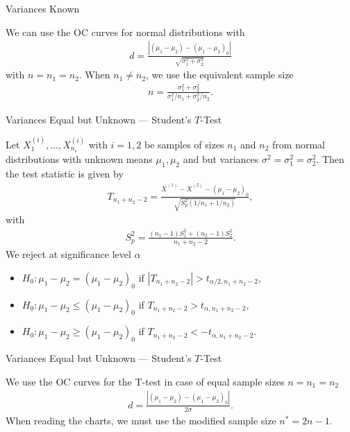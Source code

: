 \begin{frame}{Variances Known}

\justifying
{} We can use the OC curves for normal distributions with
\begin{align*}
d = \frac{|(\mu_1-\mu_2)-(\mu_1-\mu_2)_0|}{\sqrt{\sigma_1^2+\sigma_2^2}}
\end{align*}
with $n = n_1 = n_2$. When $n_1\neq n_2$, we use the equivalent sample size
\begin{align*}
n = \frac{\sigma_1^2 + \sigma_2^2}{\sigma_1^2/n_1 + \sigma_2^2/n_2}.
\end{align*}

\end{frame}

\begin{frame}{Variances Equal but Unknown --- Student's $T$-Test}

\justifying
{} Let $X_1^{(i)}, \ldots, X_{n_i}^{(i)}$ with $i = 1, 2$ be samples of sizes $n_1$ and $n_2$ from normal distributions with unknown means $\mu_1, \mu_2$ and  but  variances $\sigma^2 = \sigma_1^2 = \sigma_2^2$. Then the test statistic is given by
\footnotesize
\begin{align*}
T_{n_1+n_2-2} = \frac{\overline{X}^{(1)} - \overline{X}^{(2)} - (\mu_1-\mu_2)_0}{\sqrt{S_p^2(1/n_1+1/n_2)}},
\end{align*}
\normalsize
with 
\footnotesize
\begin{align*}
S_p^2 = \frac{(n_1-1)S_1^2 + (n_2-1)S_2^2}{n_1+n_2-2}.
\end{align*}
\normalsize
We reject at significance level $\alpha$
\begin{itemize}
	\item $H_0: \mu_1 - \mu_2 = (\mu_1-\mu_2)_0$ if $|T_{n_1+n_2-2}| > t_{\alpha/2, n_1+n_2-2}$,
	\item $H_0: \mu_1 - \mu_2 \leq (\mu_1-\mu_2)_0$ if $T_{n_1+n_2-2} > t_{\alpha,n_1+n_2-2}$,
	\item $H_0: \mu_1 - \mu_2 \geq (\mu_1-\mu_2)_0$ if $T_{n_1+n_2-2} < -t_{\alpha,n_1+n_2-2}$.
\end{itemize}

\end{frame}


\begin{frame}{Variances Equal but Unknown --- Student's $T$-Test}

\justifying
{} We use the OC curves for the T-test in case of equal sample sizes $n = n_1 = n_2$
\begin{align*}
d = \frac{|(\mu_1-\mu_2)-(\mu_1-\mu_2)_0|}{2\sigma}.
\end{align*}
When reading the charts, we must use the modified sample size $n^* = 2n-1$.

\end{frame}



